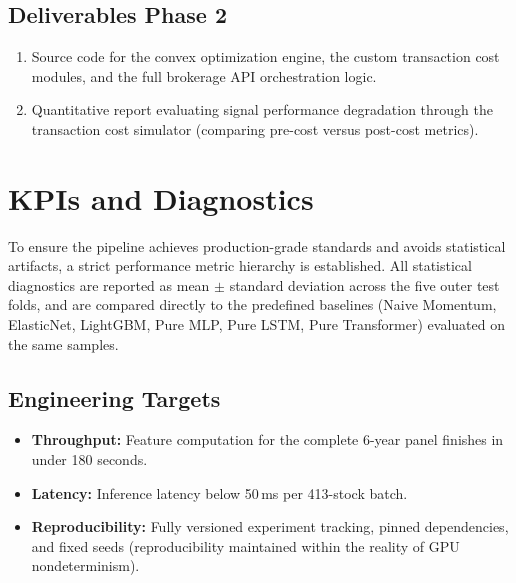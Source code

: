 \subsection*{Deliverables Phase 2}
\begin{enumerate}
    \item Source code for the convex optimization engine, the custom transaction cost modules, and the full brokerage \acs{API} orchestration logic.
    \item Quantitative report evaluating signal performance degradation through the transaction cost simulator (comparing pre-cost versus post-cost metrics).
\end{enumerate}

\section{KPIs and Diagnostics}

To ensure the pipeline achieves production-grade standards and avoids statistical artifacts, a strict performance metric hierarchy is established. All statistical diagnostics are reported as mean $\pm$ standard deviation across the five outer test folds, and are compared directly to the predefined baselines (Naive Momentum, ElasticNet, LightGBM, Pure MLP, Pure LSTM, Pure Transformer) evaluated on the same samples.

\subsection*{Engineering Targets}
\begin{itemize}
    \item \textbf{Throughput:} Feature computation for the complete 6-year panel finishes in under 180 seconds.
    \item \textbf{Latency:} Inference latency below 50\,ms per 413-stock batch.
    \item \textbf{Reproducibility:} Fully versioned experiment tracking, pinned dependencies, and fixed seeds (reproducibility maintained within the reality of GPU nondeterminism).
\end{itemize}

